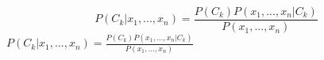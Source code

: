 $$ P(C_k | x_1,...,x_n) = \frac{P(C_k) P(x_1,...,x_n | C_k)}{P(x_1,...,x_n)} $$
$P(C_k | x_1,...,x_n) = \frac{P(C_k) P(x_1,...,x_n | C_k)}{P(x_1,...,x_n)} $
